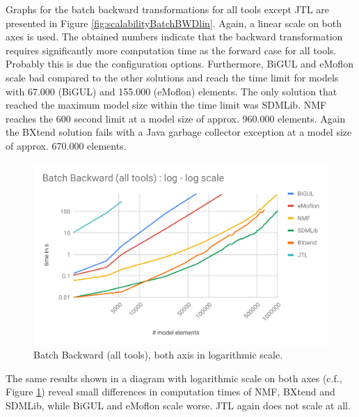 Graphs for the batch backward transformations for all tools except JTL are presented in Figure \ref{fig:scalabilityBatchBWDlin}. Again, a linear scale on both axes is used. The obtained numbers indicate that the backward transformation requires significantly more computation time as the forward case for all tools. Probably this is due the configuration options. Furthermore, BiGUL and eMoflon scale bad compared to the other solutions and reach the time limit for models with 67.000 (BiGUL) and 155.000 (eMoflon) elements. 
The only solution that reached the maximum model size within the time limit was SDMLib. NMF reaches the 600 second limit at a model size of approx. 960.000 elements. Again the BXtend solution fails with a Java garbage collector exception at a model size of approx. 670.000 elements.

\begin{figure}[h!]
	\centering
	\includegraphics[width=\columnwidth]{diagrams/scalability/BBloglog}
	\caption{Batch Backward (all tools), both axis in logarithmic scale.}
	\label{fig:scalabilityBatchBWDlog}
\end{figure}

The same results shown in a diagram with logarithmic scale on both axes (c.f., Figure \ref{fig:scalabilityBatchBWDlog}) reveal small differences in computation times of NMF, BXtend and SDMLib, while BiGUL and eMoflon scale worse. JTL again does not scale at all.

